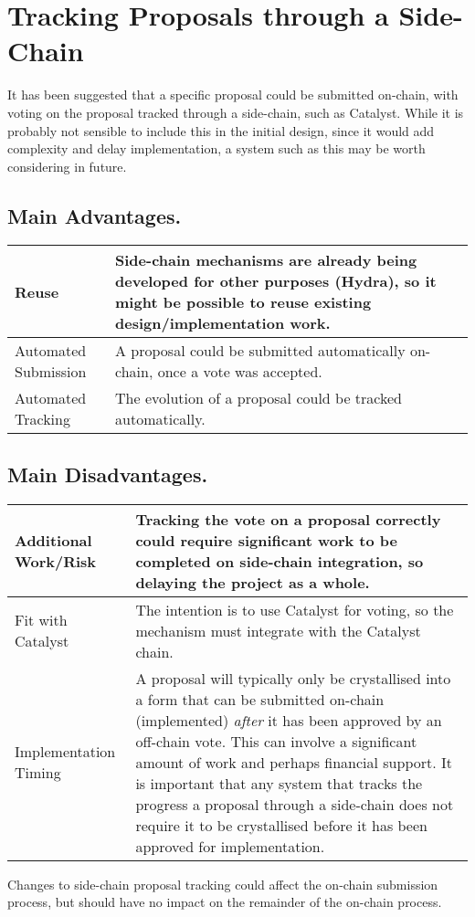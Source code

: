 \section{Tracking Proposals through a Side-Chain}

It has been suggested that a specific proposal could be submitted on-chain, with voting on the proposal tracked through a side-chain, such as Catalyst.
While it is probably not sensible to include this in the initial design, since it would add complexity and delay implementation, a system such as this
may be worth considering in future.

\subsection*{Main Advantages.}

\begin{tabular}{||l|p{4.5in}||}
  \hline\hline
  Reuse
  & Side-chain mechanisms are already being developed for other purposes (Hydra), so it might be possible to reuse existing design/implementation work.
  \\ \hline
  Automated Submission
  & A proposal could be submitted automatically on-chain, once a vote was accepted.
  \\ \hline
  Automated Tracking
  & The evolution of a proposal could be tracked automatically.
  \\ \hline
  \hline
\end{tabular}

\subsection*{Main Disadvantages.}

\begin{tabular}{||l|p{4.5in}||}
  \hline\hline
  Additional Work/Risk &
  Tracking the vote on a proposal correctly could require significant work to be completed on side-chain integration, so delaying the project as a whole.
  \\\hline
  Fit with Catalyst &
  The intention is to use Catalyst for voting, so the mechanism must integrate with the Catalyst chain.
  \\\hline
  Implementation Timing & A proposal will typically only be crystallised into a form that can be submitted on-chain (implemented) \emph{after} it has been approved by an off-chain vote.
  This can involve a significant amount of work and perhaps financial support.
  It is important that any system that tracks the progress a proposal through a side-chain does not require it to be crystallised before it has been approved for implementation.
  \\ \hline
  \hline
\end{tabular}

Changes to side-chain proposal tracking could affect the on-chain submission process, but should have no impact on the remainder of the on-chain process.
